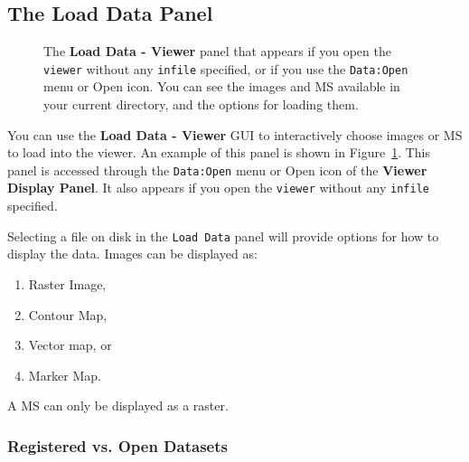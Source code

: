 
\subsection{The Load Data Panel}
\label{section:display.viewerGUI.load}

\begin{figure}[h!]
\begin{center}
\caption{\label{fig:viewer_load} The {\bf Load Data - Viewer} panel
that appears if you open the {\tt viewer} without any {\tt infile}
specified, or if you use the {\tt Data:Open} menu or Open icon.
You can see the images and MS available in your current directory,
and the options for loading them.} 
\hrulefill
\end{center}
\end{figure}

You can use the {\bf Load Data - Viewer} GUI to interactively
choose images or MS to load into the viewer.  An example of
this panel is shown in Figure~\ref{fig:viewer_load}.  This
panel is accessed through the {\tt Data:Open} menu or Open icon
of the {\bf Viewer Display Panel}.  It also appears if you open 
the {\tt viewer} without any {\tt infile} specified.

Selecting a file on disk in the {\tt Load Data} panel will
provide options for how to display the data. Images can be displayed
as: 
\begin{enumerate}
\item Raster Image, 
\item Contour Map, 
\item Vector map, or 
\item Marker Map.  
\end{enumerate}

%
%

A MS can only be displayed as a raster.


\subsubsection{Registered vs. Open Datasets}
\label{section:display.viewerGUI.load.register}

